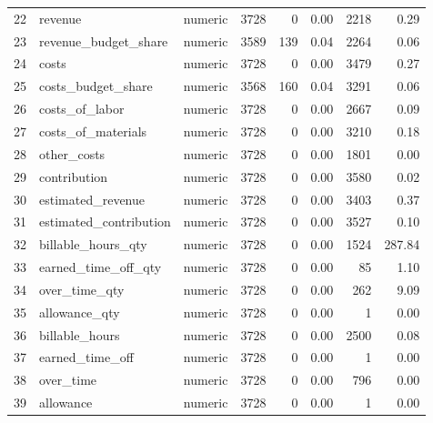 \begin{sidewaystable}[ht]
\begin{tabular}{rllrrrrr}
  22 & revenue & numeric & 3728 &   0 & 0.00 & 2218 & 0.29 \\ 
  23 & revenue\_budget\_share & numeric & 3589 & 139 & 0.04 & 2264 & 0.06 \\ 
  24 & costs & numeric & 3728 &   0 & 0.00 & 3479 & 0.27 \\ 
  25 & costs\_budget\_share & numeric & 3568 & 160 & 0.04 & 3291 & 0.06 \\ 
  26 & costs\_of\_labor & numeric & 3728 &   0 & 0.00 & 2667 & 0.09 \\ 
  27 & costs\_of\_materials & numeric & 3728 &   0 & 0.00 & 3210 & 0.18 \\ 
  28 & other\_costs & numeric & 3728 &   0 & 0.00 & 1801 & 0.00 \\ 
  29 & contribution & numeric & 3728 &   0 & 0.00 & 3580 & 0.02 \\ 
  30 & estimated\_revenue & numeric & 3728 &   0 & 0.00 & 3403 & 0.37 \\ 
  31 & estimated\_contribution & numeric & 3728 &   0 & 0.00 & 3527 & 0.10 \\ 
  32 & billable\_hours\_qty & numeric & 3728 &   0 & 0.00 & 1524 & 287.84 \\ 
  33 & earned\_time\_off\_qty & numeric & 3728 &   0 & 0.00 &  85 & 1.10 \\ 
  34 & over\_time\_qty & numeric & 3728 &   0 & 0.00 & 262 & 9.09 \\ 
  35 & allowance\_qty & numeric & 3728 &   0 & 0.00 &   1 & 0.00 \\ 
  36 & billable\_hours & numeric & 3728 &   0 & 0.00 & 2500 & 0.08 \\ 
  37 & earned\_time\_off & numeric & 3728 &   0 & 0.00 &   1 & 0.00 \\ 
  38 & over\_time & numeric & 3728 &   0 & 0.00 & 796 & 0.00 \\ 
  39 & allowance & numeric & 3728 &   0 & 0.00 &   1 & 0.00 \\ 
   \hline
\end{tabular}
\end{sidewaystable}
